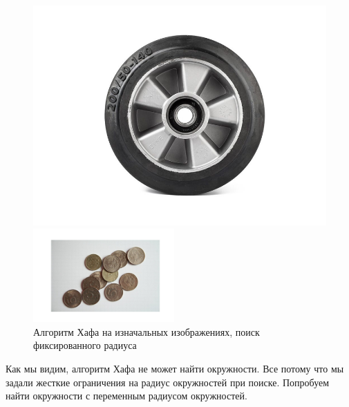 \documentclass[a4paper,12pt]{article}
\begin{document}
\begin{figure}[H]
\begin{minipage}{0.48\textwidth}
        \includegraphics[width=\textwidth]{images/hough_circles/3_orig_fixed.png}
    \end{minipage}
    \includegraphics[width=0.48\textwidth]{images/hough_circles/2_orig_fixed.png}
    \caption{Алгоритм Хафа на изначальных изображениях, поиск фиксированного радиуса}
\end{figure}
\noindent Как мы видим, алгоритм Хафа не может найти окружности. Все потому что мы задали жесткие ограничения на радиус окружностей при поиске. Попробуем найти окружности с переменным радиусом окружностей.
\end{document}
